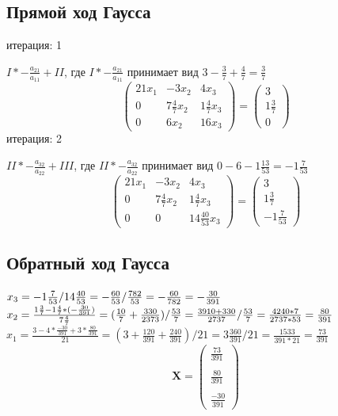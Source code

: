 \documentclass{article}
\begin{document}
\subsection{Прямой ход Гаусса}
итерация: 1 

$I * -\frac{a_{21}}{a_{11}} + II$, где 
$I * -\frac{a_{21}}{a_{11}}$ принимает вид $3 - \frac{3}{7} + \frac{4}{7} =
\frac{3}{7}$
\begin{displaymath}
\left(
  \begin{array}{ccc}
    21 x_{1} & -3 x_{2} & 4 x_{3} \\
    0 & 7 \frac{4}{7} x_{2} & 1 \frac{4}{7} x_{3} \\
    0 & 6 x_{2} & 16 x_{3}
  \end{array}
\right)
=
\left(
  \begin{array}{ccc}
    3\\
    1\frac{3}{7}\\
    0
  \end{array}
\right)
\end{displaymath}
итерация: 2

$II * -\frac{a_{32}}{a_{22}} + III$, где 
$II * -\frac{a_{32}}{a_{22}}$ принимает вид $0 - 6 - 1\frac{13}{53} =
-1\frac{7}{53}$
\begin{displaymath}
\left(
  \begin{array}{ccc}
    21 x_{1} & -3 x_{2} & 4 x_{3} \\
    0 & 7 \frac{4}{7} x_{2} & 1 \frac{4}{7} x_{3} \\
    0 & 0 & 14\frac{40}{53} x_{3}
  \end{array}
\right)
=
\left(
  \begin{array}{ccc}
    3\\
    1\frac{3}{7}\\
    -1\frac{7}{53}
  \end{array}
\right)
\end{displaymath}

\subsection{Обратный ход Гаусса}

$x_{3} = -1\frac{7}{53} / 14\frac{40}{53} 
= -\frac{60}{53}/\frac{782}{53} 
= -\frac{60}{782} 
= -\frac{30}{391} \\$
$x_{2} = \frac{1\frac{3}{7} - 1\frac{4}{7} * (-\frac{30}{391})}{7 \frac{4}{7}} 
= (\frac{10}{7} + \frac{330}{2373}) / \frac{53}{7} 
= \frac{3910 + 330}{2737} / \frac{53}{7} 
= \frac{4240 * 7}{2737 * 53} 
= \frac{80}{391}\\$
$x_{1} = \frac{3 - 4*\frac{-30}{391} + 3*\frac{80}{391}}{21}
= (3 + \frac{120}{391} + \frac{240}{391})/21
= 3\frac{360}{391} / 21
= \frac{1533}{391 * 21} 
= \frac{73}{391}$
\begin{displaymath}
\mathbf{X} =
\left( \begin{array}{ccc}
  \frac{73}{391}\\ \\
  \frac{80}{391}\\ \\
  \frac{-30}{391} 
\end{array} \right)
\end{displaymath}
\end{document}
